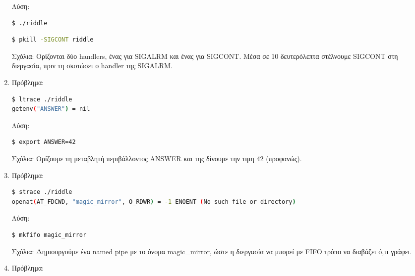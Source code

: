 \documentclass[12pt,titlepage]{article}
\newcommand{\en}{\textlatin}
\begin{document}
\begin{enumerate}
\begin{lstlisting}[language=bash]
\end{lstlisting}
\greektext

Λύση:

\latintext
\begin{lstlisting}[language=bash]
$ ./riddle
\end{lstlisting}
\greektext

\latintext
\begin{lstlisting}[language=bash]
$ pkill -SIGCONT riddle
\end{lstlisting}
\greektext

Σχόλια: Ορίζονται δύο \en{handlers}, ένας για \en{SIGALRM} και ένας για \en{SIGCONT}. Μέσα σε 10 δευτερόλεπτα στέλνουμε \en{SIGCONT} στη διεργασία, πριν τη σκοτώσει ο \en{handler} της \en{SIGALRM}.

\item

Πρόβλημα:

\latintext
\begin{lstlisting}[language=bash]
$ ltrace ./riddle
getenv("ANSWER") = nil
\end{lstlisting}
\greektext

Λύση:

\latintext
\begin{lstlisting}[language=bash]
$ export ANSWER=42
\end{lstlisting}
\greektext

Σχόλια: Ορίζουμε τη μεταβλητή περιβάλλοντος \en{ANSWER} και της δίνουμε την τιμη 42 (προφανώς).

\item

Πρόβλημα:

\latintext
\begin{lstlisting}[language=bash]
$ strace ./riddle
openat(AT_FDCWD, "magic_mirror", O_RDWR) = -1 ENOENT (No such file or directory)
\end{lstlisting}
\greektext

Λύση:

\latintext
\begin{lstlisting}[language=bash]
$ mkfifo magic_mirror
\end{lstlisting}
\greektext

Σχόλια: Δημιουργούμε ένα \en{named pipe} με το όνομα \en{magic_mirror}, ώστε η διεργασία να μπορεί με \en{FIFO} τρόπο να διαβάζει ό,τι γράφει.

\item

Πρόβλημα:


\end{enumerate}
\end{document}

